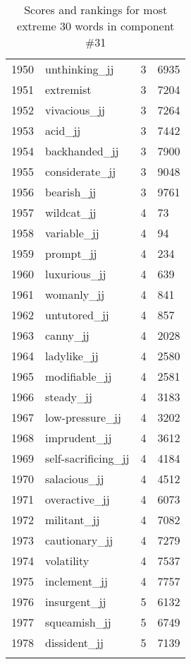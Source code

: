 \begin{longtable}[!htbp]{| rlr@{.}l |}
    1950 & unthinking\_jj & 3 & 6935 \\
    1951 & extremist & 3 & 7204 \\
    1952 & vivacious\_jj & 3 & 7264 \\
    1953 & acid\_jj & 3 & 7442 \\
    1954 & backhanded\_jj & 3 & 7900 \\
    1955 & considerate\_jj & 3 & 9048 \\
    1956 & bearish\_jj & 3 & 9761 \\
    1957 & wildcat\_jj & 4 & 73 \\
    1958 & variable\_jj & 4 & 94 \\
    1959 & prompt\_jj & 4 & 234 \\
    1960 & luxurious\_jj & 4 & 639 \\
    1961 & womanly\_jj & 4 & 841 \\
    1962 & untutored\_jj & 4 & 857 \\
    1963 & canny\_jj & 4 & 2028 \\
    1964 & ladylike\_jj & 4 & 2580 \\
    1965 & modifiable\_jj & 4 & 2581 \\
    1966 & steady\_jj & 4 & 3183 \\
    1967 & low-pressure\_jj & 4 & 3202 \\
    1968 & imprudent\_jj & 4 & 3612 \\
    1969 & self-sacrificing\_jj & 4 & 4184 \\
    1970 & salacious\_jj & 4 & 4512 \\
    1971 & overactive\_jj & 4 & 6073 \\
    1972 & militant\_jj & 4 & 7082 \\
    1973 & cautionary\_jj & 4 & 7279 \\
    1974 & volatility & 4 & 7537 \\
    1975 & inclement\_jj & 4 & 7757 \\
    1976 & insurgent\_jj & 5 & 6132 \\
    1977 & squeamish\_jj & 5 & 6749 \\
    1978 & dissident\_jj & 5 & 7139 \\
    \hline
    \caption{Scores and rankings for most extreme 30 words in component \#31} \\
\end{longtable}
